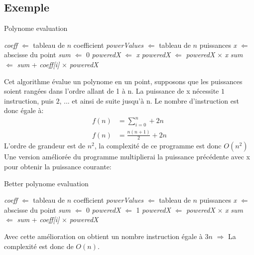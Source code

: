 \documentclass[11pt]{extarticle}
\begin{document}
\subsection{Exemple}
\begin{center}
\begin{algorithm}
\caption{Polynome evaluation}\label{polynome_eval}
\begin{algorithmic} %
    \State \textit{coeff} $\Leftarrow $ tableau de $n$ coefficient
    \State \textit{powerValues} $\Leftarrow $ tableau de $n$ puissances
    \State \textit{x} $\Leftarrow $ abscisse du point
    \State \textit{sum} $\Leftarrow $ 0
    		\State \textit{poweredX} $\Leftarrow$ \textit{x}   
    			\State \textit{poweredX} $\Leftarrow$ \textit{poweredX} $\times$ \textit{x}
    		\EndFor
    		\State \textit{sum} $\Leftarrow$ \textit{sum} + \textit{coeff[i]} $\times$ \textit{poweredX}                
    \EndFor
\end{algorithmic}
\end{algorithm}
\end{center}
Cet algorithme évalue un polynome en un point, supposons que les puissances soient rangées dans l'ordre allant de 1 à n. La puissance de x nécessite $1$ instruction, puis $2$, ... et ainsi de suite jusqu'à n. Le nombre d'instruction est donc égale à:
\begin{align*}
	f(n) &= \sum_{i=0}^n+2n\\
	f(n) &= \frac{n(n+1)}{2}+2n
\end{align*}
L'ordre de grandeur est de $n^2$, la complexité de ce programme est donc $O(n^2)$ \\
Une version améliorée du programme multiplierai la puissance précédente avec x pour obtenir la puissance courante:
\begin{center}
\begin{algorithm}
\caption{Better polynome evaluation}\label{better_polynome_eval}
\begin{algorithmic} %
    \State \textit{coeff} $\Leftarrow $ tableau de $n$ coefficient
    \State \textit{powerValues} $\Leftarrow $ tableau de $n$ puissances
    \State \textit{x} $\Leftarrow $ abscisse du point
    \State \textit{sum} $\Leftarrow $ 0
    \State \textit{poweredX} $\Leftarrow$ 1
    		\State \textit{poweredX} $\Leftarrow$ \textit{poweredX} $\times$ \textit{x}
    		\State \textit{sum} $\Leftarrow$ \textit{sum} + \textit{coeff[i]} $\times$ \textit{poweredX}                
    \EndFor
\end{algorithmic}
\end{algorithm}
\end{center}
Avec cette amélioration on obtient un nombre instruction égale à $3n$ $\Rightarrow$ La complexité est donc de $O(n)$. 
\end{document}
